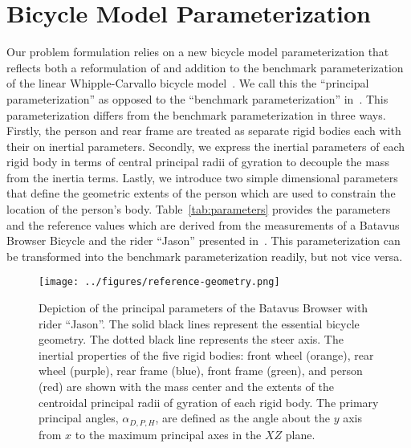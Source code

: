 \documentclass{bmd2019a}
\begin{document}
\section{Bicycle Model Parameterization}
%
Our problem formulation relies on a new bicycle model parameterization that
reflects both a reformulation of and addition to the benchmark parameterization
of the linear Whipple-Carvallo bicycle model~\cite{Meijaard2007}. We call this
the ``principal parameterization'' as opposed to the ``benchmark
parameterization'' in~\cite{Meijaard2007}. This parameterization differs from
the benchmark parameterization in three ways. Firstly, the person and rear
frame are treated as separate rigid bodies each with their on inertial
parameters. Secondly, we express the inertial parameters of each rigid body in
terms of central principal radii of gyration to decouple the mass from the
inertia terms.  Lastly, we introduce two simple dimensional parameters that
define the geometric extents of the person which are used to constrain the
location of the person's body. Table~\ref{tab:parameters} provides the
parameters and the reference values which are derived from the measurements of
a Batavus Browser Bicycle and the rider ``Jason'' presented
in~\cite{Moore2012}. This parameterization can be transformed into the
benchmark parameterization readily, but not vice versa.
%
\begin{figure}
  \centering
  \texttt{[image: ../figures/reference-geometry.png]}
  \caption{Depiction of the principal parameters of the Batavus Browser
    with rider ``Jason''. The solid black lines represent the essential bicycle
    geometry. The dotted black line represents the steer axis. The inertial
    properties of the five rigid bodies: front wheel (orange), rear wheel
    (purple), rear frame (blue), front frame (green), and person (red) are
    shown with the mass center and the extents of the centroidal principal
    radii of gyration of each rigid body. The primary principal angles,
    $\alpha_{D,P,H}$, are defined as the angle about the $y$ axis from $x$ to
    the maximum principal axes in the $XZ$ plane.}
\end{figure}
%
\end{document}
